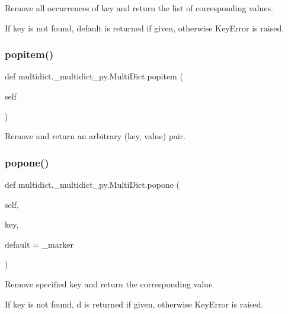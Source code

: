 \begin{DoxyVerb}Remove all occurrences of key and return the list of corresponding
values.

If key is not found, default is returned if given, otherwise
KeyError is raised.\end{DoxyVerb}
 \mbox{\label{classmultidict_1_1__multidict__py_1_1_multi_dict_ad5e95bd7ce8046c8ea6c35c6ba6d9714}} 
\subsubsection{\texorpdfstring{popitem()}{popitem()}}
{\footnotesize\ttfamily def multidict.\+\_\+multidict\+\_\+py.\+Multi\+Dict.\+popitem (\begin{DoxyParamCaption}\item[{}]{self }\end{DoxyParamCaption})}

\begin{DoxyVerb}Remove and return an arbitrary (key, value) pair.\end{DoxyVerb}
 \mbox{\label{classmultidict_1_1__multidict__py_1_1_multi_dict_a9134070c0c471813d71190fbf813b03a}} 
\subsubsection{\texorpdfstring{popone()}{popone()}}
{\footnotesize\ttfamily def multidict.\+\_\+multidict\+\_\+py.\+Multi\+Dict.\+popone (\begin{DoxyParamCaption}\item[{}]{self,  }\item[{}]{key,  }\item[{}]{default = {\ttfamily \+\_\+marker} }\end{DoxyParamCaption})}

\begin{DoxyVerb}Remove specified key and return the corresponding value.

If key is not found, d is returned if given, otherwise
KeyError is raised.\end{DoxyVerb}
 \mbox{\label{classmultidict_1_1__multidict__py_1_1_multi_dict_a29074b22916c8b839261223cdf29be5c}} 
